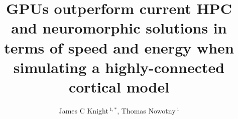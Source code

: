 \documentclass[utf8]{frontiersSCNS} %
\def\firstAuthorLast{Knight and Nowotny} %
\def\Authors{James C Knight\,$^{1,*}$, Thomas Nowotny\,$^{1}$}
\begin{document}
\onecolumn
{}

\title[GPUs outperform current SNN simulators]{GPUs
  outperform current HPC and neuromorphic solutions in terms
of speed and energy when simulating a highly-connected cortical model} 

\author[\firstAuthorLast ]{\Authors} %
\address{} %
\correspondance{} %

\extraAuth{}%


\maketitle
\end{document}
